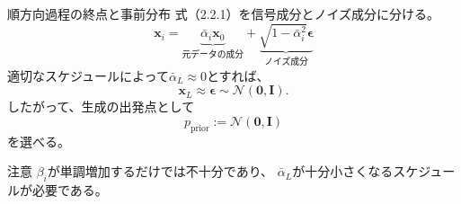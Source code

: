 \begin{frame}{順方向過程の終点と事前分布}
    式（2.2.1）を信号成分とノイズ成分に分ける。
    \[
        \boldsymbol{x}_i
        =
        \underbrace{\bar{\alpha}_i\boldsymbol{x}_0}_{\text{元データの成分}}
        +
        \underbrace{
        \sqrt{1-\bar{\alpha}_i^2}\boldsymbol{\epsilon}
        }_{\text{ノイズ成分}}
    \]
    適切なスケジュールによって$\bar{\alpha}_L\approx0$とすれば、
    \[
        \boldsymbol{x}_L\approx\boldsymbol{\epsilon}
        \sim\mathcal{N}(\boldsymbol{0},\boldsymbol{I}).
    \]
    したがって、生成の出発点として
    \[
        \boxed{
        p_{\mathrm{prior}}
        :=
        \mathcal{N}(\boldsymbol{0},\boldsymbol{I})
        }
    \]
    を選べる。
    \begin{alertblock}{注意}
        $\beta_i$が単調増加するだけでは不十分であり、
        $\bar{\alpha}_L$が十分小さくなるスケジュールが必要である。
    \end{alertblock}
\end{frame}
